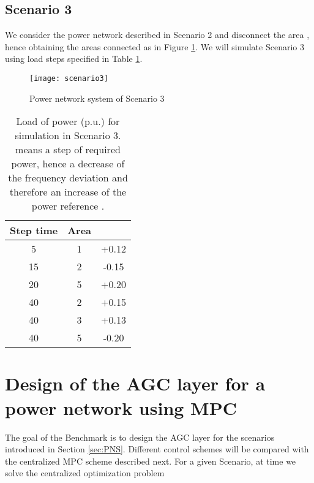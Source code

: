 \documentclass[a4paper]{article}
\begin{document}
          \subsection{Scenario 3}
               \label{sec:scenario3}
               We consider the power network described in Scenario 2 and disconnect the area , hence obtaining the areas connected as in Figure \ref{fig:scenario3}.               
               We will simulate Scenario 3 using load steps specified in Table \ref{tab:simulationscen3}.
               \begin{figure}[!ht]
                 \centering
                 \texttt{[image: scenario3]}
                 \caption{Power network system of Scenario 3}
                 \label{fig:scenario3}
               \end{figure}
               \begin{table}[!ht]
                 \centering
                 \begin{tabular}{|c|c|c|}
                   \hline
                   Step time  &  Area  &  \\
                   \hline
                   5               &      1        &   +0.12             \\
                   \hline
                   15             &      2        &   -0.15             \\
                   \hline
                   20             &      5        &   +0.20             \\
                   \hline
                   40             &      2        &   +0.15             \\
                   \hline
                   40             &      3        &   +0.13            \\
                   \hline
                   40             &      5        &   -0.20            \\
                   \hline
                 \end{tabular}
                 \caption{Load of power  (p.u.) for simulation in Scenario 3.  means a step of required power, hence a decrease of the frequency deviation  and therefore an increase of the power reference .}
                 \label{tab:simulationscen3}
               \end{table}

     
     \section{Design of the AGC layer for a power network using MPC}
          The goal of the Benchmark is to design the AGC layer for the scenarios introduced in Section \ref{sec:PNS}. Different control schemes will be compared with the centralized MPC scheme described next. For a given Scenario, at time  we solve the centralized optimization problem
                        
\end{document}
